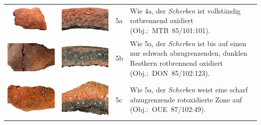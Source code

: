 \begin{footnotesize}
{\begin{longtable}{@{}m{}m{}m{}m{}@{}}
\includegraphics[width=.3\textwidth]{tbl/Tab_Fabrics/MTB85-101-101_5cm.jpg} & \includegraphics[width=.3\textwidth]{tbl/Tab_Fabrics/MTB85-101-101_2cm.jpg} & 5a & Wie 4a, der \textit{Scherben} ist vollständig rotbrennend oxidiert (Obj.:~MTB~85/101:101). \\
\includegraphics[width=.3\textwidth]{tbl/Tab_Fabrics/DON85-102-123_5cm.jpg} & \includegraphics[width=.3\textwidth]{tbl/Tab_Fabrics/DON85-102-123_2cm.jpg} & 5b & Wie 5a, der \textit{Scherben} ist bis auf einen nur schwach abzugrenzenden, dunklen Restkern rotbrennend oxidiert (Obj.:~DON~85/102:123). \\
\includegraphics[width=.3\textwidth]{tbl/Tab_Fabrics/OUE87-102-49_5cm.jpg} & \includegraphics[width=.3\textwidth]{tbl/Tab_Fabrics/OUE87-102-49_2cm.jpg} & 5c & Wie 5a, der \textit{Scherben} weist eine scharf abzugrenzende rotoxidierte Zone auf (Obj.:~OUE~87/102:49). \\

\end{longtable}}
\end{footnotesize}
